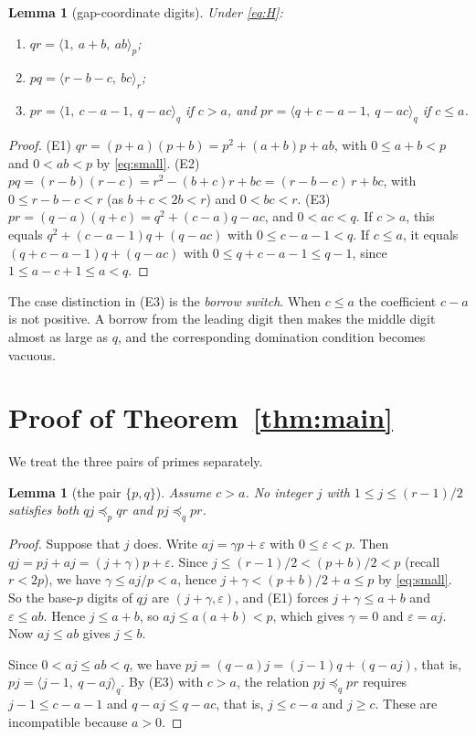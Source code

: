 \documentclass[11pt,a4paper]{article}
\newtheorem{lemma}[theorem]{Lemma}
\theoremstyle{definition}
\newcommand{\dom}[1]{\preceq_{#1}}
\newcommand{\dig}[1]{\langle #1\rangle}
\begin{document}
\begin{lemma}[gap-coordinate digits]\label{lem:digits}
Under \eqref{eq:H}:
\begin{enumerate}[label=\textup{(E\arabic*)}]
\item $qr=\dig{1,\ a+b,\ ab}_p$;
\item $pq=\dig{r-b-c,\ bc}_r$;
\item $pr=\dig{1,\ c-a-1,\ q-ac}_q$ if $c>a$, and $pr=\dig{q+c-a-1,\ q-ac}_q$ if $c\le a$.
\end{enumerate}
\end{lemma}
\begin{proof}
(E1) $qr=(p+a)(p+b)=p^2+(a+b)p+ab$, with $0\le a+b<p$ and $0<ab<p$ by \eqref{eq:small}.
(E2) $pq=(r-b)(r-c)=r^2-(b+c)r+bc=(r-b-c)\,r+bc$, with $0\le r-b-c<r$ (as $b+c<2b<r$) and $0<bc<r$.
(E3) $pr=(q-a)(q+c)=q^2+(c-a)q-ac$, and $0<ac<q$. If $c>a$, this equals $q^2+(c-a-1)q+(q-ac)$ with $0\le c-a-1<q$. If $c\le a$, it equals $(q+c-a-1)q+(q-ac)$ with $0\le q+c-a-1\le q-1$, since $1\le a-c+1\le a<q$.
\end{proof}

The case distinction in (E3) is the \emph{borrow switch}. When $c\le a$ the coefficient $c-a$ is not positive. A borrow from the leading digit then makes the middle digit almost as large as $q$, and the corresponding domination condition becomes vacuous.

\section{Proof of Theorem~\ref{thm:main}}\label{sec:proof}

We treat the three pairs of primes separately.

\begin{lemma}[the pair $\{p,q\}$]\label{lem:pq}
Assume $c>a$. No integer $j$ with $1\le j\le (r-1)/2$ satisfies both $qj\dom p qr$ and $pj\dom q pr$.
\end{lemma}
\begin{proof}
Suppose that $j$ does. Write $aj=\gamma p+\varepsilon$ with $0\le\varepsilon<p$. Then $qj=pj+aj=(j+\gamma)p+\varepsilon$. Since $j\le(r-1)/2<(p+b)/2<p$ (recall $r<2p$), we have $\gamma\le aj/p<a$, hence $j+\gamma<(p+b)/2+a\le p$ by \eqref{eq:small}. So the base-$p$ digits of $qj$ are $(j+\gamma,\varepsilon)$, and (E1) forces $j+\gamma\le a+b$ and $\varepsilon\le ab$. Hence $j\le a+b$, so $aj\le a(a+b)<p$, which gives $\gamma=0$ and $\varepsilon=aj$. Now $aj\le ab$ gives $j\le b$.

Since $0<aj\le ab<q$, we have $pj=(q-a)j=(j-1)q+(q-aj)$, that is, $pj=\dig{j-1,\ q-aj}_q$. By (E3) with $c>a$, the relation $pj\dom q pr$ requires $j-1\le c-a-1$ and $q-aj\le q-ac$, that is, $j\le c-a$ and $j\ge c$. These are incompatible because $a>0$.
\end{proof}
\end{document}

